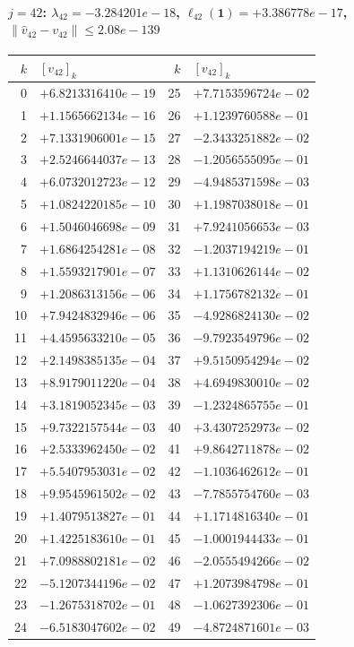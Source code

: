 \documentclass[11pt]{article}
\begin{document}
\paragraph{$j = 42$: $\lambda_{42} = -3.284201e-18$, \quad $\ell_{42}(\mathbf{1}) = +3.386778e-17$, \quad $\|\hat v_{42} - v_{42}\| \leq 2.08e-139$}
\begin{center}
{\footnotesize
\begin{tabular}{r@{\;\;}l@{\quad}r@{\;\;}l}
\toprule
$k$ & $[v_{42}]_k$ & $k$ & $[v_{42}]_k$ \\
\midrule
0 & $+6.8213316410e-19$ & 25 & $+7.7153596724e-02$ \\
1 & $+1.1565662134e-16$ & 26 & $+1.1239760588e-01$ \\
2 & $+7.1331906001e-15$ & 27 & $-2.3433251882e-02$ \\
3 & $+2.5246644037e-13$ & 28 & $-1.2056555095e-01$ \\
4 & $+6.0732012723e-12$ & 29 & $-4.9485371598e-03$ \\
5 & $+1.0824220185e-10$ & 30 & $+1.1987038018e-01$ \\
6 & $+1.5046046698e-09$ & 31 & $+7.9241056653e-03$ \\
7 & $+1.6864254281e-08$ & 32 & $-1.2037194219e-01$ \\
8 & $+1.5593217901e-07$ & 33 & $+1.1310626144e-02$ \\
9 & $+1.2086313156e-06$ & 34 & $+1.1756782132e-01$ \\
10 & $+7.9424832946e-06$ & 35 & $-4.9286824130e-02$ \\
11 & $+4.4595633210e-05$ & 36 & $-9.7923549796e-02$ \\
12 & $+2.1498385135e-04$ & 37 & $+9.5150954294e-02$ \\
13 & $+8.9179011220e-04$ & 38 & $+4.6949830010e-02$ \\
14 & $+3.1819052345e-03$ & 39 & $-1.2324865755e-01$ \\
15 & $+9.7322157544e-03$ & 40 & $+3.4307252973e-02$ \\
16 & $+2.5333962450e-02$ & 41 & $+9.8642711878e-02$ \\
17 & $+5.5407953031e-02$ & 42 & $-1.1036462612e-01$ \\
18 & $+9.9545961502e-02$ & 43 & $-7.7855754760e-03$ \\
19 & $+1.4079513827e-01$ & 44 & $+1.1714816340e-01$ \\
20 & $+1.4225183610e-01$ & 45 & $-1.0001944433e-01$ \\
21 & $+7.0988802181e-02$ & 46 & $-2.0555494266e-02$ \\
22 & $-5.1207344196e-02$ & 47 & $+1.2073984798e-01$ \\
23 & $-1.2675318702e-01$ & 48 & $-1.0627392306e-01$ \\
24 & $-6.5183047602e-02$ & 49 & $-4.8724871601e-03$ \\
\bottomrule
\end{tabular}
}
\end{center}
\end{document}
